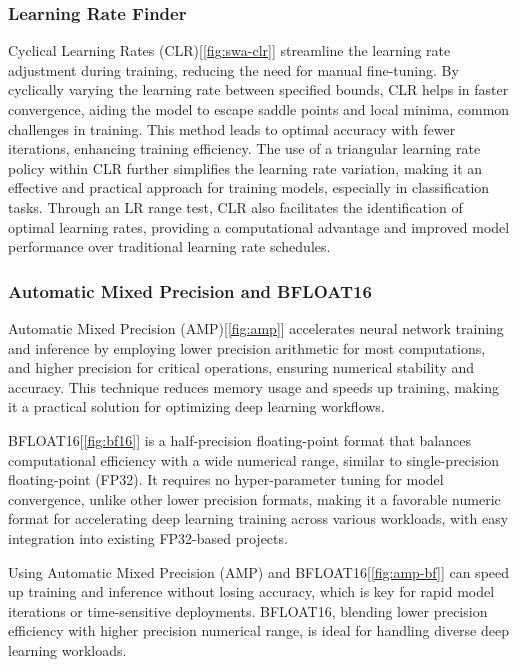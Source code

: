 \documentclass[10pt,twocolumn,letterpaper]{article}
\begin{document}
\subsubsection{Learning Rate Finder}
Cyclical Learning Rates (CLR)\cite{smith2017cyclical, huang2017snapshot}[\ref{fig:swa-clr}] streamline the learning rate adjustment during training, reducing the need for manual fine-tuning. By cyclically varying the learning rate between specified bounds, CLR helps in faster convergence, aiding the model to escape saddle points and local minima, common challenges in training. This method leads to optimal accuracy with fewer iterations, enhancing training efficiency. The use of a triangular learning rate policy within CLR further simplifies the learning rate variation, making it an effective and practical approach for training models, especially in classification tasks. Through an LR range test, CLR also facilitates the identification of optimal learning rates, providing a computational advantage and improved model performance over traditional learning rate schedules\cite{smith2017cyclical}.

\subsubsection{Automatic Mixed Precision and BFLOAT16}
Automatic Mixed Precision (AMP)\cite{micikevicius2018mixed}[\ref{fig:amp}] accelerates neural network training and inference by employing lower precision arithmetic for most computations, and higher precision for critical operations, ensuring numerical stability and accuracy. This technique reduces memory usage and speeds up training, making it a practical solution for optimizing deep learning workflows.

BFLOAT16\cite{kalamkar2019study}[\ref{fig:bf16}] is a half-precision floating-point format that balances computational efficiency with a wide numerical range, similar to single-precision floating-point (FP32). It requires no hyper-parameter tuning for model convergence, unlike other lower precision formats, making it a favorable numeric format for accelerating deep learning training across various workloads, with easy integration into existing FP32-based projects.

Using Automatic Mixed Precision (AMP) and BFLOAT16\cite{micikevicius2018mixed, kalamkar2019study}[\ref{fig:amp-bf}] can speed up training and inference without losing accuracy, which is key for rapid model iterations or time-sensitive deployments. BFLOAT16, blending lower precision efficiency with higher precision numerical range, is ideal for handling diverse deep learning workloads.
\end{document}
